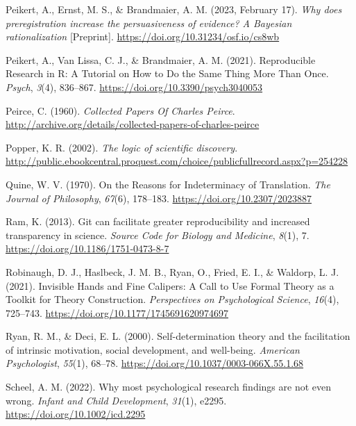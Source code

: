 \documentclass[
  man, noextraspace,floatsintext]{apa7}
\newlength{\cslhangindent}
\newenvironment{CSLReferences}[2] %
 {\begin{list}{}{%
  \setlength{\itemindent}{0pt}
  \setlength{\leftmargin}{0pt}
  \setlength{\parsep}{0pt}
  \ifodd #1
   \setlength{\leftmargin}{\cslhangindent}
   \setlength{\itemindent}{-1\cslhangindent}
  \fi
  \setlength{\itemsep}{#2\baselineskip}}}
 {\end{list}}
\begin{document}
\begin{CSLReferences}{1}{0}
Peikert, A., Ernst, M. S., \& Brandmaier, A. M. (2023, February 17). \emph{Why does preregistration increase the persuasiveness of evidence? {A Bayesian} rationalization} {[}Preprint{]}. \url{https://doi.org/10.31234/osf.io/cs8wb}

Peikert, A., Van Lissa, C. J., \& Brandmaier, A. M. (2021). Reproducible {Research} in {R}: {A Tutorial} on {How} to {Do} the {Same Thing More Than Once}. \emph{Psych}, \emph{3}(4), 836--867. \url{https://doi.org/10.3390/psych3040053}

Peirce, C. (1960). \emph{Collected {Papers Of Charles Peirce}}. \url{http://archive.org/details/collected-papers-of-charles-peirce}

Popper, K. R. (2002). \emph{The logic of scientific discovery}. \url{http://public.ebookcentral.proquest.com/choice/publicfullrecord.aspx?p=254228}

Quine, W. V. (1970). On the {Reasons} for {Indeterminacy} of {Translation}. \emph{The Journal of Philosophy}, \emph{67}(6), 178--183. \url{https://doi.org/10.2307/2023887}

Ram, K. (2013). Git can facilitate greater reproducibility and increased transparency in science. \emph{Source Code for Biology and Medicine}, \emph{8}(1), 7. \url{https://doi.org/10.1186/1751-0473-8-7}

Robinaugh, D. J., Haslbeck, J. M. B., Ryan, O., Fried, E. I., \& Waldorp, L. J. (2021). Invisible {Hands} and {Fine Calipers}: {A Call} to {Use Formal Theory} as a {Toolkit} for {Theory Construction}. \emph{Perspectives on Psychological Science}, \emph{16}(4), 725--743. \url{https://doi.org/10.1177/1745691620974697}

Ryan, R. M., \& Deci, E. L. (2000). Self-determination theory and the facilitation of intrinsic motivation, social development, and well-being. \emph{American Psychologist}, \emph{55}(1), 68--78. \url{https://doi.org/10.1037/0003-066X.55.1.68}

Scheel, A. M. (2022). Why most psychological research findings are not even wrong. \emph{Infant and Child Development}, \emph{31}(1), e2295. \url{https://doi.org/10.1002/icd.2295}


\end{CSLReferences}
\end{document}
